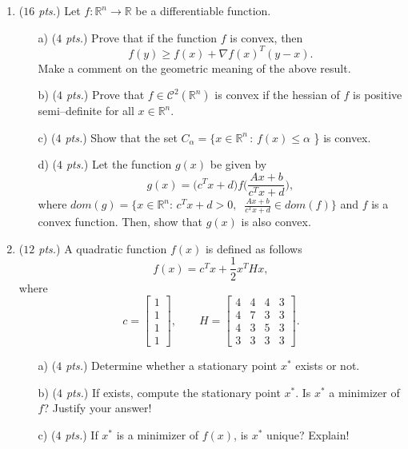 \documentclass[a4paper,11pt]{article}
\begin{document}
\begin{enumerate}
\item (\textit{$16$ pts.}) Let $f: \mathbb{R}^n \rightarrow \mathbb{R}$ be a differentiable function.
    \begin{itemize}
	   \item[a)] (\textit{$4$ pts.}) Prove that if the function $f$ is convex, then
       \[
           f(y) \geq f(x) + \nabla f(x)^T (y-x).
       \]
       Make a comment on the geometric meaning of the above result.
	   \item[b)] (\textit{$4$ pts.})  Prove that $f \in \mathcal{C}^2(\mathbb{R}^n)$ is convex if the hessian of $f$ is positive semi--definite for all $x \in \mathbb{R}^n$.
       \item[c)] (\textit{$4$ pts.})  Show that the set $C_{\alpha} = \{ x \in \mathbb{R}^n\, : \, f(x) \leq \alpha$ \} is convex.
       \item[d)] (\textit{$4$ pts.})  Let the function $g(x)$ be given by
       \[
           g(x) = \big( c^T x + d \big) f \Big( \frac{Ax+b}{c^T x + d} \Big),
       \]
       where  $dom(g) = \{ x \in  \mathbb{R}^n  : \, c^T x + d >0, \;\; \frac{Ax+b}{c^T x + d} \in dom(f) \}$  and  $f$ is a convex function. Then, show that $g(x)$ is also convex.
    \end{itemize}


\item  (\textit{$12$ pts.}) A quadratic function  $f(x)$  is defined as follows
    \[
     f(x) = c^Tx+\frac{1}{2}x^THx,
     \]
    where
    \[
        c = \begin{bmatrix}
                1 \\ 1 \\ 1 \\ 1
             \end{bmatrix}, \qquad
        H = \begin{bmatrix}
                4 & 4 & 4 & 3 \\
                4 & 7 & 3 & 3 \\
                4 & 3 & 5 & 3 \\
                3 & 3 & 3 & 3
             \end{bmatrix}.
\]
    \begin{itemize}
        \item[a)] (\textit{$4$ pts.}) Determine whether a stationary point $x^*$ exists or not.
        \item[b)] (\textit{$4$ pts.}) If exists, compute the stationary point $x^*$. Is $x^*$ a minimizer of $f$? Justify your answer!
        \item[c)] (\textit{$4$ pts.}) If $x^*$ is a minimizer of $f(x)$, is $x^*$ unique? Explain!
    \end{itemize}


\end{enumerate}
\end{document}
